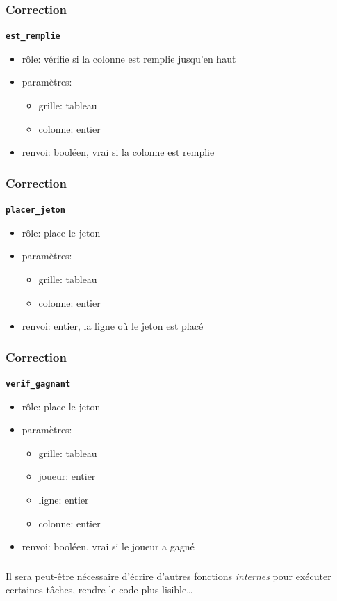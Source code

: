 \documentclass[svgnames,11pt]{beamer}
\begin{document}
\begin{frame}
    \frametitle{Correction}

    {\Large \textbf{\texttt{est\_remplie}}}
    \begin{itemize}
        \item rôle: vérifie si la colonne est remplie jusqu'en haut
        \item paramètres:
        \begin{itemize}
            \item grille: tableau
            \item colonne: entier
        \end{itemize}
        \item renvoi: booléen, vrai si la colonne est remplie
    \end{itemize}

\end{frame}
\begin{frame}
    \frametitle{Correction}

    {\Large \textbf{\texttt{placer\_jeton}}}
    \begin{itemize}
        \item rôle: place le jeton 
        \item paramètres:
        \begin{itemize}
            \item grille: tableau
            \item colonne: entier
        \end{itemize}
        \item renvoi: entier, la ligne où le jeton est placé
    \end{itemize}

\end{frame}
\begin{frame}
    \frametitle{Correction}

    {\Large \textbf{\texttt{verif\_gagnant}}}
    \begin{itemize}
        \item rôle: place le jeton 
        \item paramètres:
        \begin{itemize}
            \item grille: tableau
            \item joueur: entier
            \item ligne: entier
            \item colonne: entier
        \end{itemize}
        \item renvoi: booléen, vrai si le joueur a gagné
    \end{itemize}

\end{frame}
\begin{frame}
    \frametitle{}

    \begin{aretenir}[Remarque]
    Il sera peut-être nécessaire d'écrire d'autres fonctions  \emph{internes} pour exécuter certaines tâches, rendre le code plus lisible\dots
    \end{aretenir}

\end{frame}
\end{document}
